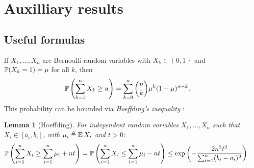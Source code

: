 \documentclass[a4paper]{article}
\newcommand \techreport[1]{#1}
\newcommand \ieeetrans[1]{}
\newcommand \defn {\mathrel{\triangleq}}
\renewcommand\Pr{\mathop{\mbox{\ensuremath{\mathbb{P}}}}\nolimits}
\newcommand\E{\mathop{\mbox{\ensuremath{\mathbb{E}}}}\nolimits}
\newcommand\set[1] {\left\{#1\right\}}
\theoremstyle{plain} \newtheorem{remark}{Remark}
\theoremstyle{plain} \newtheorem{definition}{Definition}
\theoremstyle{plain} \newtheorem{example}{Example}
\theoremstyle{plain} \newtheorem{assumption}{Assumption}
\theoremstyle{plain} \newtheorem{conjecture}{Conjecture}
\theoremstyle{plain} \newtheorem{theorem}{Theorem}
\theoremstyle{plain} \newtheorem{proposition}{Proposition}
\theoremstyle{plain} \newtheorem{lemma}{Lemma}
\theoremstyle{plain} \newtheorem{corollary}{Corollary}
\begin{document}
\appendix
\techreport{\section{Auxilliary results}}
\subsection{Useful formulas}
\label{sec:binomial}
If $X_1, \ldots, X_n$ are Bernoulli random variables with $X_k \in
\set{0, 1}$ and $\Pr(X_k = 1) = \mu$ for all $k$, then
\begin{equation}
  \label{eq:binomial}
  \Pr\left(\sum_{k=1}^n X_k \geq u\right)
    =
    \sum_{k=0}^{u} \binom{n}{k} \mu^k (1 - \mu)^{n-k}.
\end{equation}
This probability can be bounded via \textit{Hoeffding's inequality} \cite{Hoeffding}:
\label{sec:Hoeffding}
\begin{lemma}[Hoeffding]
  For independent random variables $X_1, \ldots, X_n$ such that
  $X_i \in [a_i, b_i]$, with  $\mu_i \defn \E X_i$ and $t>0$:
  \begin{align}
    \Pr\left(
      \sum_{i=1}^n X_i \geq \sum_{i=1}^n \mu_i + n t
    \right) 
    \ieeetrans{&}
    = \Pr\left(
      \sum_{i=1}^n X_i \leq \sum_{i=1}^n \mu_i - n t
    \right) 
    \ieeetrans{\nonumber\\&}
    \leq
    \exp\left(
      -\frac{2n^2t^2}{\sum_{i=1}^n (b_i - a_i)^2}
    \right).
    \label{eq:hoeffding}
  \end{align}
  \label{lem:hoeffding}
\end{lemma}
\iffalse
Specifically for Bernoulli trials, we can use the Chernoff-Hoeffding
bound~\cite{Hoeffding}:
\begin{lemma}[Chernoff-Hoeffding]
  For independent random variables $X_1, \ldots, X_n$ such that $X_i
  \in \{0, 1\}$, with $\E X_i = \mu$ and $t>0$:
  \begin{align}
    \Pr\Big(
      \sum_{i=1}^n \frac{X_i}{n} \geq \mu +  t
    \Big) 
    &
    \leq
    \left[
      \Big( \frac{\mu}{\mu + t} \Big)^{\mu + t}
      \hspace{-4pt}
      \Big( \frac{1 - \mu}{1 - \mu - t} \Big)^{1 - \mu - t}
    \right]^n,\notag
    \\
    \Pr\Big(
      \sum_{i=1}^n \frac{X_i}{n} \leq \mu - t
    \Big) 
    &
    \leq
    \left[
      \Big( \frac{\mu}{\mu - t} \Big)^{\mu - t}
      \hspace{-4pt}
      \Big( \frac{1 - \mu}{1 - \mu + t} \Big)^{1 - \mu + t}
    \right]^n.
    \label{eq:chernoff-hoeffding}
  \end{align}
  \label{lem:chernoff-hoeffding}
\end{lemma}
\fi
\end{document}
